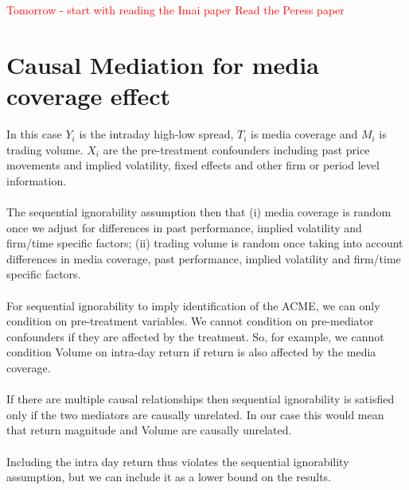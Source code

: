 \documentclass{article}
\begin{document}
	
	
	
	
	
	
	\textcolor{red}{}
	\\~\\
	\textcolor{red}{Tomorrow - start with reading the Imai paper}
	\textcolor{red}{Read the Peress paper}
	
	
	
	
	
	\section{Causal Mediation for media coverage effect}
	
	In this case $Y_i$ is the intraday high-low spread, $T_i$ is media coverage and $M_i$ is trading volume. $X_i$ are the pre-treatment confounders including past price movements and implied volatility, fixed effects and other firm or period level information. 
	\\~\\
	The sequential ignorability assumption then that (i) media coverage is random once we adjust for differences in past performance, implied volatility and firm/time specific factors; (ii) trading volume is random once taking into account differences in media coverage, past performance, implied volatility and firm/time specific factors. 
	\\~\\
	For sequential ignorability to imply identification of the ACME, we can only condition on pre-treatment variables. We cannot condition on pre-mediator confounders if they are affected by the treatment. So, for example, we cannot condition Volume on intra-day return if return is also affected by the media coverage.
	\\~\\
	If there are multiple causal relationships then sequential ignorability is satisfied only if the two mediators are causally unrelated. In our case this would mean that return magnitude and Volume are causally unrelated. 
	\\~\\
	Including the intra day return thus violates the sequential ignorability assumption, but we can include it as a lower bound on the results. 
	
\end{document}
